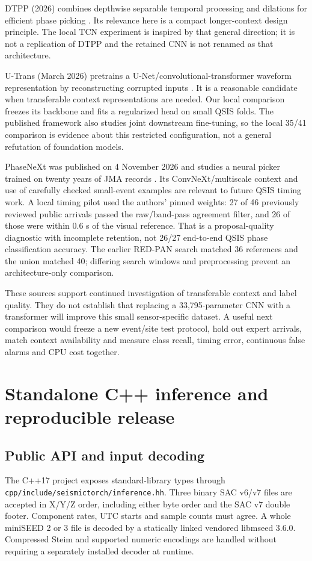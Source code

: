 \documentclass[a4paper,11pt,oneside]{article}
\newcommand{\code}[1]{\nolinkurl{#1}}
\begin{document}
DTPP (2026) combines depthwise separable temporal processing and dilations
for efficient phase picking \cite{dtpp}. Its relevance here is a compact
longer-context design principle. The local TCN experiment is inspired by
that general direction; it is not a replication of DTPP and the retained
CNN is not renamed as that architecture.

U-Trans (March 2026) pretrains a U-Net/convolutional-transformer waveform
representation by reconstructing corrupted inputs \cite{utrans}. It is a
reasonable candidate when transferable context representations are needed.
Our local comparison freezes its backbone and fits a regularized head on
small QSIS folds. The published framework also studies joint downstream
fine-tuning, so the local 35/41 comparison is evidence about this restricted
configuration, not a general refutation of foundation models.

PhaseNeXt was published on 4 November 2026 and studies a neural picker trained
on twenty years of JMA records \cite{phasenext}. Its ConvNeXt/multiscale context
and use of carefully checked small-event examples are relevant to future
QSIS timing work. A local timing pilot used the authors' pinned weights:
27 of 46 previously reviewed public arrivals passed the raw/band-pass
agreement filter, and 26 of those were within 0.6 s of the visual reference.
That is a proposal-quality diagnostic with incomplete retention, not 26/27
end-to-end QSIS phase classification accuracy. The earlier RED-PAN search
matched 36 references and the union matched 40; differing search windows
and preprocessing prevent an architecture-only comparison.

These sources support continued investigation of transferable context and
label quality. They do not establish that replacing a 33,795-parameter CNN
with a transformer will improve this small sensor-specific dataset. A useful
next comparison would freeze a new event/site test protocol, hold out expert
arrivals, match context availability and measure class recall, timing error,
continuous false alarms and CPU cost together.
\FloatBarrier

\section{Standalone C++ inference and reproducible release}
\subsection{Public API and input decoding}
The C++17 project exposes standard-library types through
\code{cpp/include/seismictorch/inference.hh}. Three binary SAC v6/v7 files
are accepted in X/Y/Z order, including either byte order and the SAC v7
double footer. Component rates, UTC starts and sample counts must agree.
A whole miniSEED 2 or 3 file is decoded by a statically linked vendored
libmseed 3.6.0. Compressed Steim and supported numeric encodings are handled
without requiring a separately installed decoder at runtime.
\end{document}
